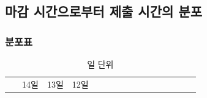 \documentclass[
]{article}
\begin{document}
\subsection{마감 시간으로부터 제출 시간의
분포}\label{uxb9c8uxac10-uxc2dcuxac04uxc73cuxb85cuxbd80uxd130-uxc81cuxcd9c-uxc2dcuxac04uxc758-uxbd84uxd3ec}

\subsubsection{분포표}\label{uxbd84uxd3ecuxd45c}

\begin{longtable}[]{@{}
  >{\raggedright\arraybackslash}p{}
  >{\centering\arraybackslash}p{}
  >{\centering\arraybackslash}p{}
  >{\centering\arraybackslash}p{}
  >{\centering\arraybackslash}p{}
  >{\centering\arraybackslash}p{}
  >{\centering\arraybackslash}p{}
  >{\centering\arraybackslash}p{}
  >{\centering\arraybackslash}p{}
  >{\centering\arraybackslash}p{}
  >{\centering\arraybackslash}p{}
  >{\centering\arraybackslash}p{}
  >{\centering\arraybackslash}p{}
  >{\centering\arraybackslash}p{}
  >{\centering\arraybackslash}p{}
  >{\centering\arraybackslash}p{}@{}}
\caption{일 단위}\tabularnewline
\toprule\noalign{}
\begin{minipage}[b]{\linewidth}\raggedright
~
\end{minipage} & \begin{minipage}[b]{\linewidth}\centering
14일
\end{minipage} & \begin{minipage}[b]{\linewidth}\centering
13일
\end{minipage} & \begin{minipage}[b]{\linewidth}\centering
12일
\end{minipage} & \begin{minipage}[b]{\linewidth}\centering

\end{minipage}
\end{longtable}
\end{document}
